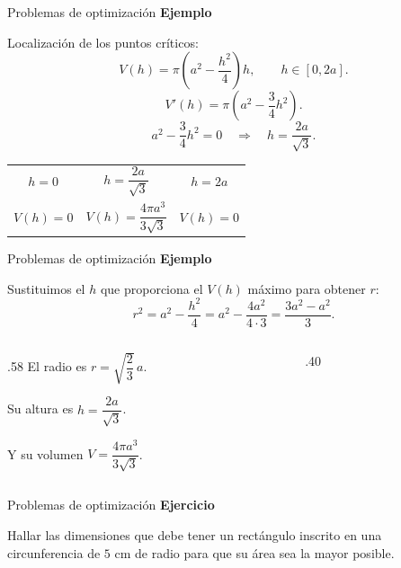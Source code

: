 \documentclass[main.tex]{subfiles}
\begin{document}
\begin{frame}{Problemas de optimización}
\small\textbf{Ejemplo}\par Localización de los puntos críticos:
\[V(h)=\pi\left(a^2-\frac{h^2}{4}\right)h,\qquad h\in[0,2a].\]
\[V'(h)=\pi\left(a^2-\frac34h^2\right).\]
\[a^2-\frac34h^2=0\quad\Longrightarrow\quad h=\frac{2a}{\sqrt3}.\]
\begin{center}\renewcommand{\arraystretch}{1.8}
\begin{tabular}{c|c|c}
$h=0$ & $h=\dfrac{2a}{\sqrt3}$ & $h=2a$\\
$V(h)=0$ & $V(h)=\dfrac{4\pi a^3}{3\sqrt3}$ & $V(h)=0$
\end{tabular}\end{center}
\end{frame}
\begin{frame}{Problemas de optimización}
\small\textbf{Ejemplo}\par Sustituimos el $h$ que proporciona el $V(h)$ máximo para obtener $r$:
\[r^2=a^2-\frac{h^2}{4}=a^2-\frac{4a^2}{4\cdot3}=\frac{3a^2-a^2}{3}.\]
\begin{columns}[c]
\begin{column}{.58\textwidth}
El radio es $r=\sqrt{\dfrac23}\,a$.
\medskip

Su altura es $h=\dfrac{2a}{\sqrt3}$.
\medskip

Y su volumen $V=\dfrac{4\pi a^3}{3\sqrt3}$.
\end{column}
\begin{column}{.40\textwidth}\end{column}
\end{columns}
\end{frame}
\begin{frame}{Problemas de optimización}
\textbf{Ejercicio}\par Hallar las dimensiones que debe tener un rectángulo inscrito en una circunferencia de $5$ cm de radio para que su área sea la mayor posible.
\end{frame}
\end{document}
